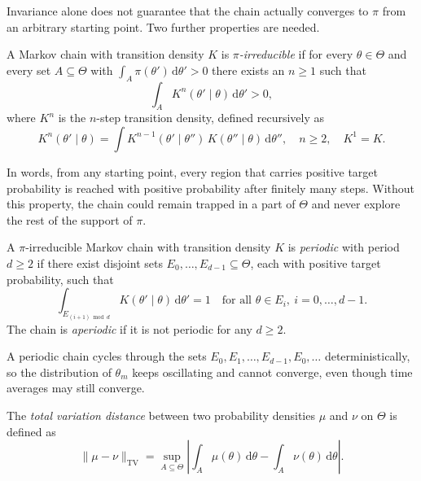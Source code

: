 Invariance alone does not guarantee that the chain actually converges to $\pi$ from an arbitrary starting point. Two further properties are needed.

\begin{definition}
    \label{def:irreducibility}
    A Markov chain with transition density $K$ is \emph{$\pi$-irreducible} if for every $\theta\in\Theta$ and every set $A\subseteq\Theta$ with $\int_A \pi(\theta')\,\mathrm{d}\theta'>0$ there exists an $n\ge 1$ such that
    \begin{equation}
        \int_A K^n(\theta'\mid\theta)\,\mathrm{d}\theta' > 0,
    \end{equation}
    where $K^n$ is the $n$-step transition density, defined recursively as
    \begin{equation}
        K^n(\theta'\mid\theta) = \int K^{n-1}(\theta'\mid\theta'')\,K(\theta''\mid\theta)\,\mathrm{d}\theta'', \quad n\ge 2, \quad K^1 = K.
    \end{equation}
\end{definition}
In words, from any starting point, every region that carries positive target probability is reached with positive probability after finitely many steps. Without this property, the chain could remain trapped in a part of $\Theta$ and never explore the rest of the support of $\pi$.

\begin{definition}
    \label{def:aperiodicity}
    A $\pi$-irreducible Markov chain with transition density $K$ is \emph{periodic} with period $d\ge 2$ if there exist disjoint sets $E_0,\ldots,E_{d-1}\subseteq\Theta$, each with positive target probability, such that
    \begin{equation}
        \int_{E_{(i+1)\bmod d}} K(\theta'\mid\theta)\,\mathrm{d}\theta' = 1 \quad \text{for all } \theta\in E_i,\ i=0,\ldots,d-1.
    \end{equation}
    The chain is \emph{aperiodic} if it is not periodic for any $d\ge 2$.
\end{definition}
A periodic chain cycles through the sets $E_0,E_1,\ldots,E_{d-1},E_0,\ldots$ deterministically, so the distribution of $\theta_m$ keeps oscillating and cannot converge, even though time averages may still converge. 
\begin{definition}
    \label{def:total_variation}
    The \emph{total variation distance} between two probability densities $\mu$ and $\nu$ on $\Theta$ is defined as
    \begin{equation}
        \|\mu-\nu\|_{\mathrm{TV}} = \sup_{A\subseteq\Theta}\left|\int_A \mu(\theta)\,\mathrm{d}\theta - \int_A \nu(\theta)\,\mathrm{d}\theta\right|.
    \end{equation}
\end{definition}

